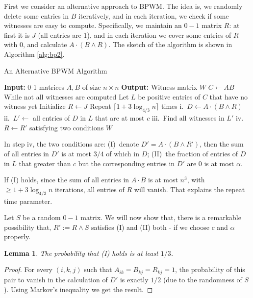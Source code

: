 \documentclass[11pt]{article}
\theoremstyle{plain}
\newtheorem{lemma}{Lemma}[section]
\begin{document}
First we consider an alternative approach to BPWM. The idea is, we randomly delete some entries in $B$ iteratively, and in each iteration, we check if some witnesses are easy to compute. Specifically, we maintain an $0-1$ matrix $R$: at first it is $J$ (all entries are $1$), and in each iteration we cover some entries of $R$ with $0$, and calculate $A\cdot (B\land R)$. The sketch of the algorithm is shown in Algorithm \ref{alg:bp2}.

\begin{algorithm}
    \caption{An Alternative BPWM Algorithm}
    \label{alg:bp2}
    \begin{algorithmic}[1]
        \STATE \textbf{Input:} 0-1 matrices $A,B$ of size $n\times n$
        \STATE \textbf{Output:} Witness matrix $W$
        \STATE $C\leftarrow AB$
        \STATE While not all witnesses are computed
            \STATE\quad Let $L$ be positive entries of $C$ that have no witness yet
            \STATE\quad Initialize $R\leftarrow J$
            \STATE\quad Repeat $\lceil1+3\log_{4/3}n\rceil$ times
                \STATE\quad\quad i.\ $D\leftarrow A\cdot (B\land R)$
                \STATE\quad\quad ii.\ $L'\leftarrow$ all entries of $D$ in $L$ that are at most $c$
                \STATE\quad\quad iii.\ Find all witnesses in $L'$
                \STATE\quad\quad iv.\ $R\leftarrow R'$ satisfying two conditions
    \RETURN $W$
    \end{algorithmic}
\end{algorithm}

In step iv, the two conditions are: (I)\ denote $D'=A\cdot (B\land R')$, then the sum of all entries in $D'$ is at most $3/4$ of which in $D$; (II)\ the fraction of entries of $D$ in $L$ that greater than $c$ but the corresponding entries in $D'$ are $0$ is at most $\alpha$.

If (I) holds, since the sum of all entries in $A\cdot B$ is at most $n^3$, with $\ge 1+3\log_{4/3} n$ iterations, all entries of $R$ will vanish. That explains the repeat time parameter.

Let $S$ be a random $0-1$ matrix. We will now show that, there is a remarkable possibility that, $R':=R\land S$ satisfies (I) and (II) both - if we choose $c$ and $\alpha$ properly.

\begin{lemma}
\label{apspext1}
The probability that (I) holds is at least $1/3$.
\end{lemma}

\begin{proof}
For every $(i,k,j)$ such that $A_{ik}=B_{kj}=R_{kj}=1$, the probability of this pair to vanish in the calculation of $D'$ is exactly $1/2$ (due to the randomness of $S$). Using Markov's inequality we get the result.
\end{proof}
\end{document}
